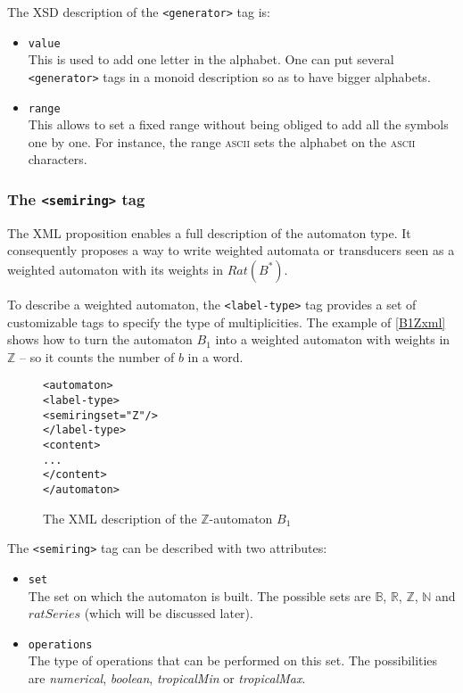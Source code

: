 \documentclass[a4paper]{article}
\newcommand{\xtag}[1]{\texttt{<#1>}}
\newcommand{\xattr}[1]{\texttt{#1}}
\def\typetagend{\xtag{/label-type}}
\def\typetag{\xtag{label-type}}
\def\semiringtag{\xtag{semiring}}
\def\generatortag{\xtag{generator}}
\begin{document}
The XSD description of the \generatortag{} tag is:
\begin{itemize}
\item \xattr{value}\\
  This is used to add one letter in the alphabet. One can put several
  \generatortag{} tags in a monoid description so as to have bigger
  alphabets.
\item \xattr{range}\\
  This allows to set a fixed range without being obliged to add all
  the symbols one by one. For instance, the range \textsc{ascii} sets
  the alphabet on the \textsc{ascii} characters.
\end{itemize}

\subsubsection{The \semiringtag{} tag}

The XML proposition enables a full description of the automaton type.
It consequently proposes a way to write weighted automata or
transducers seen as a weighted automaton with its weights in
$Rat(B^*)$.

To describe a weighted automaton, the \typetag{} tag provides a set of
customizable tags to specify the type of multiplicities. The example
of \autoref{B1Zxml} shows how to turn the automaton $B_1$ into a
weighted automaton with weights in ${\mathbb Z}$ -- so it counts the
number of $b$ in a word.

\begin{figure}[ht]
  \small
  \begin{center}
\begin{alltt}
<automaton>
  \typetag{}
     <semiring set="Z"/>
  \typetagend{}
  <content>
  ...
  </content>
</automaton>
\end{alltt}

\caption{The XML description of the $\mathbb{Z}$-automaton $B_1$}
\label{B1Zxml}
  \end{center}
\end{figure}

The \semiringtag{} tag can be described with two attributes:
\begin{itemize}
\item \xattr{set}\\
  The set on which the automaton is built. The possible sets are
  ${\mathbb B}$, ${\mathbb R}$, ${\mathbb Z}$, ${\mathbb N}$ and
  $ratSeries$ (which will be discussed later).
\item \xattr{operations}\\
  The type of operations that can be performed on this set.  The
  possibilities are \textit{numerical}, \textit{boolean},
  \textit{tropicalMin} or \textit{tropicalMax}.
\end{itemize}
\end{document}
